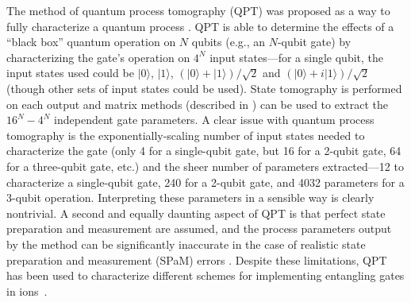 \documentclass[%
12pt,
 amsmath,amssymb,
]{revtex4-2}
\newcommand{\zero}{|0 \rangle}
\newcommand{\one}{|1 \rangle}
\begin{document}
The method of quantum process tomography (QPT) was proposed as a way to fully characterize a quantum process \cite{ChuangNielsenQPT1997, PoyatosCompleteChar1997}. QPT is able to determine the effects of a ``black box'' quantum operation on $N$ qubits (e.g., an $N$-qubit gate) by characterizing the gate's operation on $4^N$ input states---for a single qubit, the input states used could be $\zero$, $\one$, $(\zero + \one) / \sqrt{2}$ and $(\zero + i \one) / \sqrt{2}$ (though other sets of input states could be used). State tomography is performed on each output and matrix methods (described in \cite{ChuangNielsenQPT1997}) can be used to extract the $16^N - 4^N$ independent gate parameters. A clear issue with quantum process tomography is the exponentially-scaling number of input states needed to characterize the gate (only 4 for a single-qubit gate, but 16 for a 2-qubit gate, 64 for a three-qubit gate, etc.) and the sheer number of parameters extracted---12 to characterize a single-qubit gate, 240 for a 2-qubit gate, and 4032 parameters for a 3-qubit operation. Interpreting these parameters in a sensible way is clearly nontrivial. A second and equally daunting aspect of QPT is that perfect state preparation and measurement are assumed, and the process parameters output by the method can be significantly inaccurate in the case of realistic state preparation and measurement (SPaM) errors \cite{WeinsteinQPT2004}. Despite these limitations, QPT has been used to characterize different schemes for implementing entangling gates in ions~\cite{RiebeProcessTomography2005}.
\end{document}
